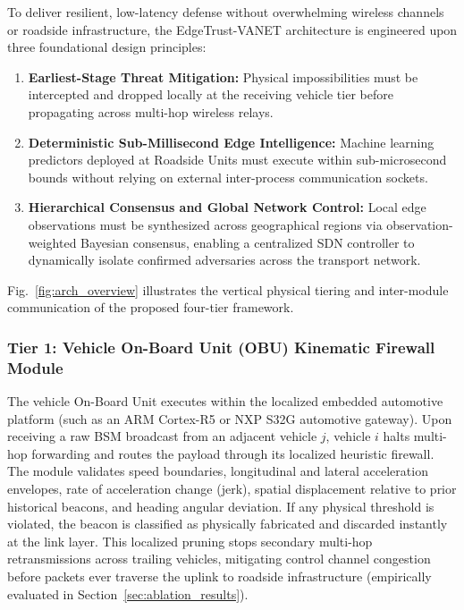 \documentclass[conference]{IEEEtran}
\begin{document}
To deliver resilient, low-latency defense without overwhelming wireless channels or roadside infrastructure, the EdgeTrust-VANET architecture is engineered upon three foundational design principles:
\begin{enumerate}
    \item \textbf{Earliest-Stage Threat Mitigation:} Physical impossibilities must be intercepted and dropped locally at the receiving vehicle tier before propagating across multi-hop wireless relays.
    \item \textbf{Deterministic Sub-Millisecond Edge Intelligence:} Machine learning predictors deployed at Roadside Units must execute within sub-microsecond bounds without relying on external inter-process communication sockets.
    \item \textbf{Hierarchical Consensus and Global Network Control:} Local edge observations must be synthesized across geographical regions via observation-weighted Bayesian consensus, enabling a centralized SDN controller to dynamically isolate confirmed adversaries across the transport network.
\end{enumerate}

Fig.~\ref{fig:arch_overview} illustrates the vertical physical tiering and inter-module communication of the proposed four-tier framework.

\subsubsection{Tier 1: Vehicle On-Board Unit (OBU) Kinematic Firewall Module}
The vehicle On-Board Unit executes within the localized embedded automotive platform (such as an ARM Cortex-R5 or NXP S32G automotive gateway). Upon receiving a raw BSM broadcast from an adjacent vehicle $j$, vehicle $i$ halts multi-hop forwarding and routes the payload through its localized heuristic firewall. The module validates speed boundaries, longitudinal and lateral acceleration envelopes, rate of acceleration change (jerk), spatial displacement relative to prior historical beacons, and heading angular deviation. If any physical threshold is violated, the beacon is classified as physically fabricated and discarded instantly at the link layer. This localized pruning stops secondary multi-hop retransmissions across trailing vehicles, mitigating control channel congestion before packets ever traverse the uplink to roadside infrastructure (empirically evaluated in Section~\ref{sec:ablation_results}).
\end{document}
